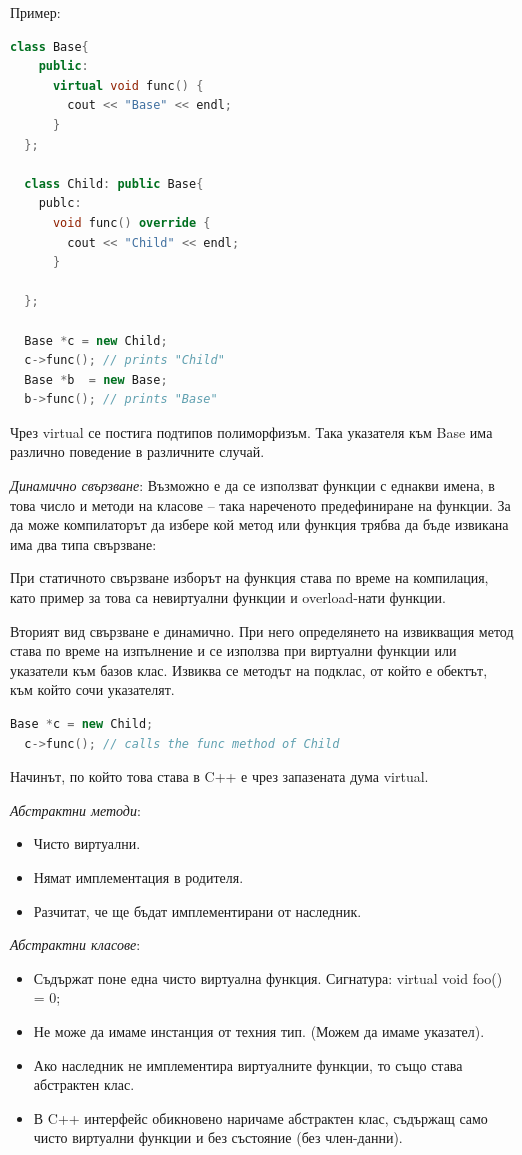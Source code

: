 \documentclass{article}
\renewcommand{\\}{\newline}
\begin{document}
Пример:

\begin{lstlisting}[language=C++]
  class Base{
    public:
      virtual void func() {
        cout << "Base" << endl;
      }
  };

  class Child: public Base{
    publc:
      void func() override {
        cout << "Child" << endl;
      }
      
  };

  Base *c = new Child;
  c->func(); // prints "Child"
  Base *b  = new Base; 
  b->func(); // prints "Base"
\end{lstlisting}

Чрез virtual се постига подтипов полиморфизъм. Така указателя към Base има различно поведение в различните случай.

\textit{Динамично свързване}: Възможно е да се използват функции с еднакви имена, в това число и методи на класове – така нареченото предефиниране на функции. За да може компилаторът да избере кой метод или функция трябва да бъде извикана има два типа свързване:

При статичното свързване изборът на функция става по време на компилация, като пример за това са невиртуални функции и overload-нати функции. 

Вторият вид свързване е динамично. При него определянето на извикващия метод става по време на изпълнение и се използва при виртуални функции или указатели към базов клас. Извиква се методът на подклас, от който е обектът, към който сочи указателят. 

\begin{lstlisting}[language=C++]
  Base *c = new Child;
  c->func(); // calls the func method of Child
\end{lstlisting}

Начинът, по който това става в C++  е чрез запазената дума virtual.

\textit{Абстрактни методи}: 
\begin{itemize}
    \item Чисто виртуални.
    \item Нямат имплементация в родителя.
    \item Разчитат, че ще бъдат имплементирани от наследник.
\end{itemize}

\textit{Абстрактни класове}: 
\begin{itemize}
    \item Съдържат поне една чисто виртуална функция. Сигнатура: virtual void foo() = 0;
    \item Не може да имаме инстанция от техния тип. (Можем да имаме указател).
    \item Ако наследник не имплементира виртуалните функции, то също става абстрактен клас.
    \item В C++ интерфейс обикновено наричаме абстрактен клас, съдържащ само чисто виртуални функции и без състояние (без член-данни).
\end{itemize}
\end{document}
